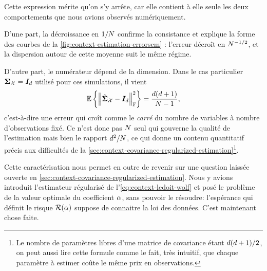 \begin{remark}
  Cette expression mérite qu'on s'y arrête, car elle contient à elle seule les deux comportements que nous avions observés numériquement.

  D'une part, la décroissance en $1/N$ confirme la consistance et explique la forme des courbes de la \cref{fig:context-estimation-errorscm} : l'erreur décroît en $N^{-1/2}$, et la dispersion autour de cette moyenne suit le même régime.

  D'autre part, le numérateur dépend de la dimension. Dans le cas particulier $\boldsymbol{\Sigma}_{\mathcal{X}}=\boldsymbol{I}_{d}$ utilisé pour ces simulations, il vient
  $$
  \operatorname{\mathbb{E}}\left\{\left\|\hat{\boldsymbol{\Sigma}}_{\mathcal{X}} - \boldsymbol{I}_{d}\right\|_{\mathbb{F}}^2\right\}
  =
  \frac{d(d+1)}{N-1},
  $$
  c'est-à-dire une erreur qui croît comme le \emph{carré} du nombre de variables à nombre d'observations fixé. Ce n'est donc pas $N$ seul qui gouverne la qualité de l'estimation mais bien le rapport $d^2/N$, ce qui donne un contenu quantitatif précis aux difficultés de la \cref{sec:context-covariance-regularized-estimation}\footnote{Le nombre de paramètres libres d'une matrice de covariance étant $d(d+1)/2$, on peut aussi lire cette formule comme le fait, très intuitif, que chaque paramètre à estimer coûte le même prix en observations.}.
\end{remark}

Cette caractérisation nous permet en outre de revenir sur une question laissée ouverte en \cref{sec:context-covariance-regularized-estimation}. Nous y avions introduit l'estimateur régularisé de l'\cref{eq:context-ledoit-wolf} et posé le problème de la valeur optimale du coefficient $\alpha$, sans pouvoir le résoudre: l'espérance qui définit le risque $\mathcal{R}(\alpha)$ suppose de connaitre la loi des données. C'est maintenant chose faite.


